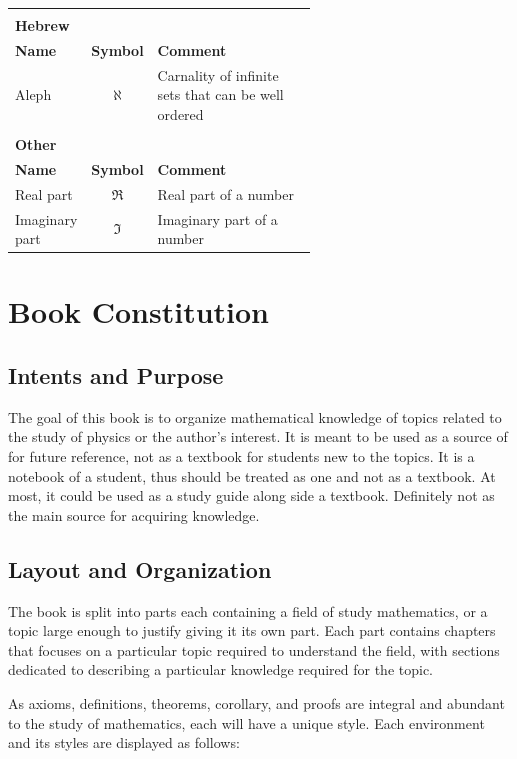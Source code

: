 \documentclass[12pt, english]{book}
\begin{document}
\begin{tabularx}{\textwidth}{ l c p{0.6\linewidth}}
 		& & \\
 		\multicolumn{3}{l}{\textbf{{\large Hebrew}}} \\ [10pt]
 		\hline
 		\textbf{Name} & \textbf{Symbol} & \textbf{Comment} \\
 		\hline
 		Aleph					& $\aleph$			& Carnality of infinite sets that can be well ordered \\
 		\hline
 		
 		& & \\
 		\multicolumn{3}{l}{\textbf{{\large Other}}} \\ [10pt]
 		\hline
 		\textbf{Name} & \textbf{Symbol} & \textbf{Comment} \\
 		\hline
 		Real part 				& $\Re$				& Real part of a number \\
 		Imaginary part 			& $\Im$				& Imaginary part of a number \\
 		\hline
	\end{tabularx}

	\newpage
	\section*{Book Constitution}
	\subsection*{Intents and Purpose}
	The goal of this book is to organize mathematical knowledge of topics related to the study of physics or the author's interest. It is meant to be used as a source of for future reference, not as a textbook for students new to the topics. It is a notebook of a student, thus should be treated as one and not as a textbook. At most, it could be used as a study guide along side a textbook. Definitely not as the main source for acquiring knowledge. 
	
	\subsection*{Layout and Organization}
	The book is split into parts each containing a field of study mathematics, or a topic large enough to justify giving it its own part. Each part contains chapters that focuses on a particular topic required to understand the field, with sections dedicated to describing a particular knowledge required for the topic. 
	
	As axioms, definitions, theorems, corollary, and proofs are integral and abundant to the study of mathematics, each will have a unique style. Each environment and its styles are displayed as follows: 
	
\end{document}
